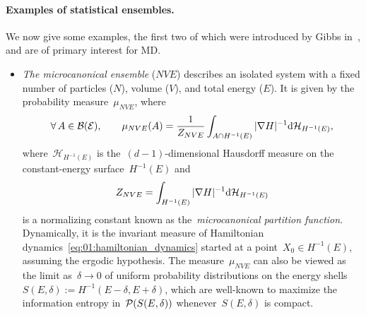\paragraph{Examples of statistical ensembles.}
We now give some examples, the first two of which were introduced by Gibbs in~\cite{G02}, and are of primary interest for MD.
\begin{itemize}
    \item{\textit{The microcanonical ensemble} ($NVE$) describes an isolated system with a fixed number of particles ($N$), volume ($V$), and total energy ($E$). It is given by the probability measure~$\mu_{NVE}$, where
    \begin{equation}
        \label{eq:01:microcanonical_distribution}
        \forall\,A\in\mathcal B(\mathcal{E}),\qquad \mu_{NVE}(A) = \frac1{Z_{NVE}}\int_{A\cap H^{-1}(E)}|\nabla H|^{-1}\mathrm{d}\mathcal{H}_{H^{-1}(E)},
    \end{equation}
    where~$\mathcal{H}_{H^{-1}(E)}$ is the~$(d-1)$-dimensional Hausdorff measure on the constant-energy surface~$H^{-1}(E)$ and
    \[Z_{NVE}=\int_{H^{-1}(E)}|\nabla H|^{-1}\mathrm{d}\mathcal{H}_{H^{-1}(E)}\]
    is a normalizing constant known as the~\textit{microcanonical partition function}. Dynamically, it is the invariant measure of Hamiltonian dynamics~\eqref{eq:01:hamiltonian_dynamics} started at a point~$X_0\in H^{-1}(E)$, assuming the ergodic hypothesis. The measure~$\mu_{NVE}$ can also be viewed as the limit as~$\delta\to 0$ of uniform probability distributions on the energy shells~$S(E,\delta):=H^{-1}(E-\delta,E+\delta)$, which are well-known to maximize the information entropy in~$\mathcal{P}(S(E,\delta))$ whenever~$S(E,\delta)$ is compact.}


\end{itemize}
